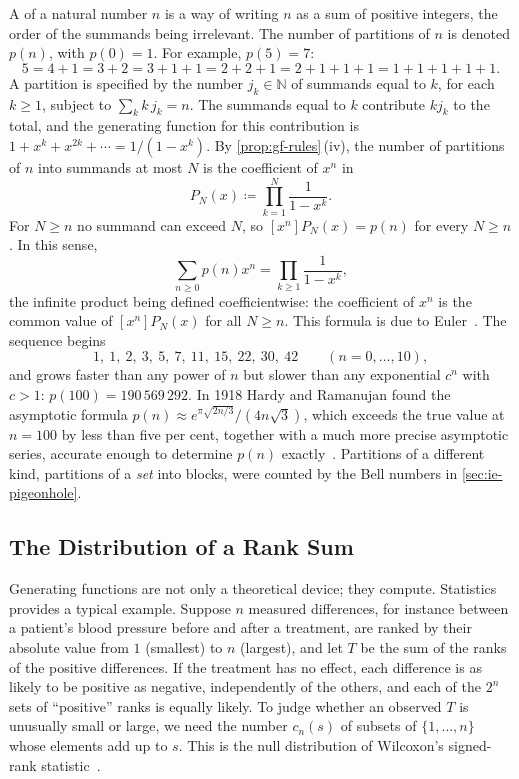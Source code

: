 A  of a natural number $n$ is a way of writing $n$ as a sum of positive integers, the order of the summands being irrelevant. The number of partitions of $n$ is denoted $p(n)$, with $p(0)=1$. For example, $p(5)=7$:
\[
5=4+1=3+2=3+1+1=2+2+1=2+1+1+1=1+1+1+1+1 .
\]
A partition is specified by the number $j_k\in\mathbb N$ of summands equal to $k$, for each $k\ge1$, subject to $\sum_kk\,j_k=n$. The summands equal to $k$ contribute $kj_k$ to the total, and the generating function for this contribution is $1+x^k+x^{2k}+\cdots=1/(1-x^k)$. By \cref{prop:gf-rules}\,(iv), the number of partitions of $n$ into summands at most $N$ is the coefficient of $x^n$ in
\[
P_N(x)\coloneqq\prod_{k=1}^{N}\frac1{1-x^k}.
\]
For $N\ge n$ no summand can exceed $N$, so $[x^n]P_N(x)=p(n)$ for every $N\ge n$. In this sense,
\[
\sum_{n\ge0}p(n)x^n=\prod_{k\ge1}\frac1{1-x^k},
\]
the infinite product being defined coefficientwise: the coefficient of $x^n$ is the common value of $[x^n]P_N(x)$ for all $N\ge n$. This formula is due to Euler~\cite{andrews1976partitions}. The sequence begins
\[
1,\ 1,\ 2,\ 3,\ 5,\ 7,\ 11,\ 15,\ 22,\ 30,\ 42\qquad(n=0,\ldots,10),
\]
and grows faster than any power of $n$ but slower than any exponential $c^n$ with $c>1$: $p(100)=190\,569\,292$. In 1918 Hardy and Ramanujan found the asymptotic formula $p(n)\approx e^{\pi\sqrt{2n/3}}/(4n\sqrt3)$, which exceeds the true value at $n=100$ by less than five per cent, together with a much more precise asymptotic series, accurate enough to determine $p(n)$ exactly~\cite{hardyramanujan1918}. Partitions of a different kind, partitions of a \emph{set} into blocks, were counted by the Bell numbers in \cref{sec:ie-pigeonhole}.

\subsection{The Distribution of a Rank Sum}

Generating functions are not only a theoretical device; they compute. Statistics provides a typical example. Suppose $n$ measured differences, for instance between a patient's blood pressure before and after a treatment, are ranked by their absolute value from $1$ (smallest) to $n$ (largest), and let $T$ be the sum of the ranks of the positive differences. If the treatment has no effect, each difference is as likely to be positive as negative, independently of the others, and each of the $2^n$ sets of ``positive'' ranks is equally likely. To judge whether an observed $T$ is unusually small or large, we need the number $c_n(s)$ of subsets of $\{1,\ldots,n\}$ whose elements add up to $s$. This is the null distribution of Wilcoxon's signed-rank statistic~\cite{wilcoxon1945}.

